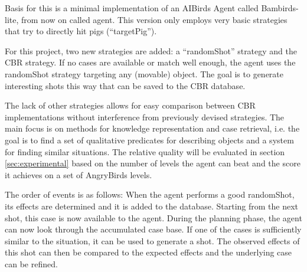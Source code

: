 Basis for this is a minimal implementation of an AIBirds Agent called Bambirds-lite, from now on called agent.
This version only employs very basic strategies that try to directly hit pigs (``targetPig'').

For this project, two new strategies are added: a ``randomShot'' strategy and the CBR strategy.
If no cases are available or match well enough, the agent uses the randomShot strategy targeting any (movable) object. The goal is to generate interesting shots this way that can be saved to the \ac{CBR} database.

The lack of other strategies allows for easy comparison between CBR implementations without interference from previously devised strategies.
The main focus is on methods for knowledge representation and case retrieval, i.e. the goal is to find a set of qualitative predicates for describing objects and a system for finding similar situations.
The relative quality will be evaluated in section \ref{sec:experimental} based on the number of levels the agent can beat and the score it achieves on a set of AngryBirds levels.

The order of events is as follows:
When the agent performs a good randomShot, its effects are determined and it is added to the database. Starting from the next shot, this case is now available to the agent.
During the planning phase, the agent can now look through the accumulated case base.
If one of the cases is sufficiently similar to the situation, it can be used to generate a shot.
The observed effects of this shot can then be compared to the expected effects and the underlying case can be refined.
